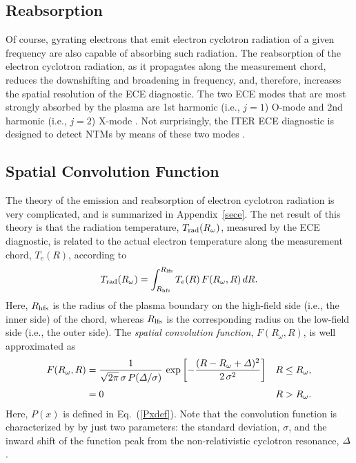 \documentclass{iopjournal}
\begin{document}
{\subsection{Reabsorption} 
Of course, gyrating electrons that emit electron cyclotron radiation of a given frequency are also capable of absorbing such radiation. 
 The reabsorption of the electron cyclotron radiation, as it propagates along the measurement chord, reduces the  downshifting and broadening
in frequency, and, therefore, increases the spatial resolution of the ECE diagnostic. The two ECE modes that are most strongly
absorbed by the plasma are 1st harmonic (i.e., $j=1$) O-mode and 2nd harmonic (i.e., $j=2$) X-mode \cite{bornatici}.
Not surprisingly, the ITER ECE diagnostic is designed  to detect NTMs by means of these two modes \cite{ece4a,ece5}.

\subsection{Spatial Convolution Function}
The theory of the emission and reabsorption of electron cyclotron radiation is very complicated, and is summarized in Appendix~\ref{sece}. 
The net result of this theory is that the radiation temperature, $T_{\rm rad}(R_\omega)$, measured by the ECE diagnostic, is related
to the actual electron temperature along the measurement chord, $T_e(R)$, according to
\begin{equation}
T_{\rm rad}(R_\omega)  = \int^{R_{\rm lfs}}_{R_{\rm hfs}} T_e(R)\,F(R_\omega, R)\,dR.
\end{equation}
Here, $R_{\rm hfs}$ is the radius
of the plasma boundary on the high-field side (i.e., the inner side) of the chord, whereas $R_{\rm lfs}$ is the corresponding radius 
on the low-field side (i.e., the outer side). The {\em spatial convolution function}, $F(R_\omega,R)$, is well approximated as
\begin{align}
F(R_\omega,R)&= \frac{1}{\sqrt{2\pi}\,\sigma \,P({\mit\Delta}/\sigma)}\,
\exp\left[-\frac {(R-R_\omega+{\mit\Delta})^2}{2\,\sigma^2}\right]&R\leq R_\omega,\\[0.5ex]
&= 0& R>R_\omega.
\end{align}
Here, $P(x)$ is defined in Eq.~(\ref{Pxdef}). Note that the convolution function is characterized by by just two parameters: the standard deviation, $\sigma$, and the inward shift
of the function peak from the non-relativistic cyclotron resonance, ${\mit\Delta}$. 

}
\end{document}
